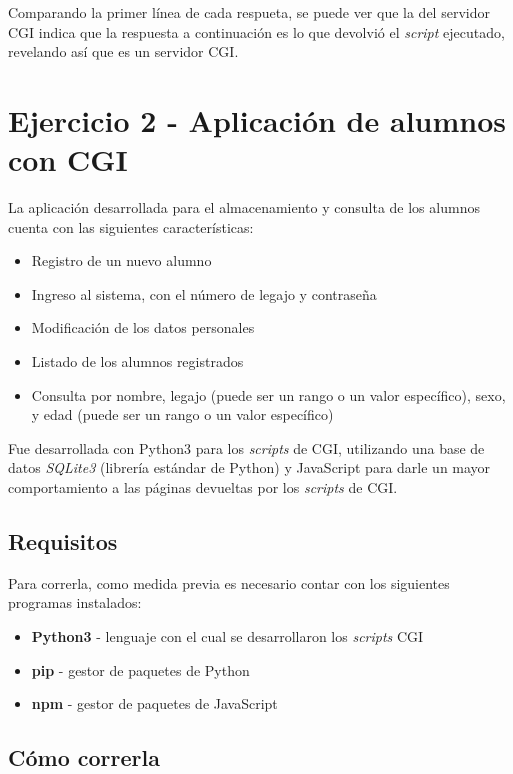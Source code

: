Comparando la primer línea de cada respueta, se puede ver que la del servidor CGI indica que la respuesta a continuación es lo que devolvió el \emph{script} ejecutado, revelando así que es un servidor CGI.

\section{Ejercicio 2 - Aplicación de alumnos con CGI}

La aplicación desarrollada para el almacenamiento y consulta de los alumnos cuenta con las siguientes características:

\begin{itemize}
    \item Registro de un nuevo alumno
    \item Ingreso al sistema, con el número de legajo y contraseña
    \item Modificación de los datos personales
    \item Listado de los alumnos registrados
    \item Consulta por nombre, legajo (puede ser un rango o un valor específico), sexo, y edad (puede ser un rango o un valor específico)
\end{itemize}

Fue desarrollada con Python3 para los \emph{scripts} de CGI, utilizando una base de datos \emph{SQLite3} (librería estándar de Python) y JavaScript para darle un mayor comportamiento a las páginas devueltas por los \emph{scripts} de CGI.

\subsection{Requisitos}

Para correrla, como medida previa es necesario contar con los siguientes programas instalados:

\begin{itemize}
    \item \textbf{Python3} - lenguaje con el cual se desarrollaron los \emph{scripts} CGI  
    \item \textbf{pip} - gestor de paquetes de Python 
    \item \textbf{npm} - gestor de paquetes de JavaScript
\end{itemize}

\subsection{Cómo correrla}

